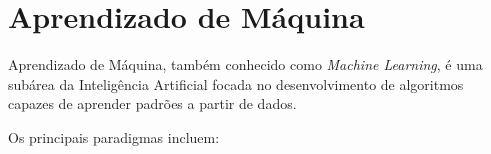 \section{Aprendizado de Máquina}

Aprendizado de Máquina, também conhecido como \textit{Machine Learning}, é uma subárea da
Inteligência Artificial focada no desenvolvimento de algoritmos capazes de aprender padrões a
partir de dados.

Os principais paradigmas incluem: 